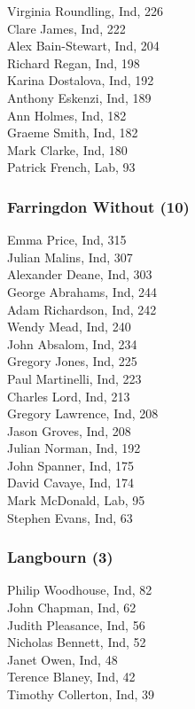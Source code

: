\documentclass[a4paper,openany,10pt]{book}
\begin{document}
Virginia Roundling, Ind, 226\\
Clare James, Ind, 222\\
Alex Bain-Stewart, Ind, 204\\
Richard Regan, Ind, 198\\
Karina Dostalova, Ind, 192\\
Anthony Eskenzi, Ind, 189\\
Ann Holmes, Ind, 182\\
Graeme Smith, Ind, 182\\
Mark Clarke, Ind, 180\\
Patrick French, Lab, 93\\


\subsubsection*{Farringdon Without (10)}



Emma Price, Ind, 315\\
Julian Malins, Ind, 307\\
Alexander Deane, Ind, 303\\
George Abrahams, Ind, 244\\
Adam Richardson, Ind, 242\\
Wendy Mead, Ind, 240\\
John Absalom, Ind, 234\\
Gregory Jones, Ind, 225\\
Paul Martinelli, Ind, 223\\
Charles Lord, Ind, 213\\
Gregory Lawrence, Ind, 208\\
Jason Groves, Ind, 208\\
Julian Norman, Ind, 192\\
John Spanner, Ind, 175\\
David Cavaye, Ind, 174\\
Mark McDonald, Lab, 95\\
Stephen Evans, Ind, 63\\


\subsubsection*{Langbourn (3)}



Philip Woodhouse, Ind, 82\\
John Chapman, Ind, 62\\
Judith Pleasance, Ind, 56\\
Nicholas Bennett, Ind, 52\\
Janet Owen, Ind, 48\\
Terence Blaney, Ind, 42\\
Timothy Collerton, Ind, 39\\
\end{document}
